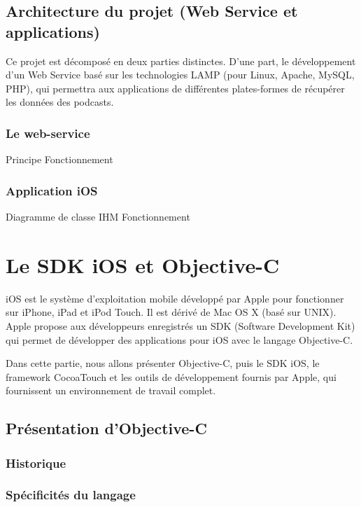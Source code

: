 \documentclass[11pt, french]{report}
\begin{document}
\section{Architecture du projet (Web Service et applications)}
Ce projet est décomposé en deux parties distinctes. D’une part, le développement d’un Web Service basé sur les technologies LAMP (pour Linux, Apache, MySQL, PHP), qui permettra aux applications de différentes plates-formes de récupérer les données des podcasts.

\subsection{Le web-service}

Principe
Fonctionnement


\subsection{Application iOS}

Diagramme de classe
IHM
Fonctionnement 


\chapter{Le SDK iOS et Objective-C}

iOS est le système d’exploitation mobile développé par Apple pour fonctionner sur iPhone, iPad et iPod Touch. Il est dérivé de Mac OS X (basé sur UNIX). Apple propose aux développeurs enregistrés un SDK (Software Development Kit) qui permet de développer des applications pour iOS avec le langage Objective-C.

Dans cette partie, nous allons présenter Objective-C, puis le SDK iOS, le framework CocoaTouch et les outils de développement fournis par Apple, qui fournissent un environnement de travail complet. 

\section{Présentation d'Objective-C}

\subsection{Historique}


\subsection{Spécificités du langage}
\end{document}
